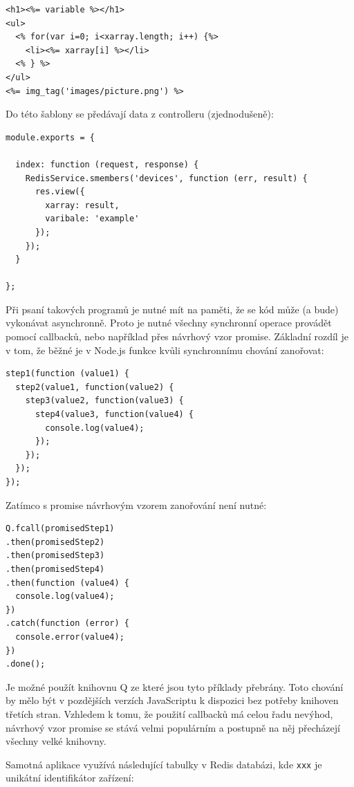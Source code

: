 \begin{verbatim}
<h1><%= variable %></h1>
<ul>
  <% for(var i=0; i<xarray.length; i++) {%>
    <li><%= xarray[i] %></li>
  <% } %>
</ul>
<%= img_tag('images/picture.png') %>
\end{verbatim}

Do této šablony se předávají data z controlleru (zjednodušeně):

\begin{verbatim}
module.exports = {

  index: function (request, response) {
    RedisService.smembers('devices', function (err, result) {
      res.view({
        xarray: result,
        varibale: 'example'
      });
    });
  }

};
\end{verbatim}

Při psaní takových programů je nutné mít na paměti, že se kód může (a bude) vykonávat asynchronně. Proto je nutné všechny synchronní operace provádět pomocí callbacků, nebo například přes návrhový vzor promise. Základní rozdíl je v tom, že běžné je v Node.js funkce kvůli synchronnímu chování zanořovat:

\begin{verbatim}
step1(function (value1) {
  step2(value1, function(value2) {
    step3(value2, function(value3) {
      step4(value3, function(value4) {
        console.log(value4);
      });
    });
  });
});
\end{verbatim}

Zatímco s promise návrhovým vzorem zanořování není nutné:

\begin{verbatim}
Q.fcall(promisedStep1)
.then(promisedStep2)
.then(promisedStep3)
.then(promisedStep4)
.then(function (value4) {
  console.log(value4);
})
.catch(function (error) {
  console.error(value4);
})
.done();
\end{verbatim}

Je možné použít knihovnu Q \cite{q} ze které jsou tyto příklady přebrány. Toto chování by mělo být v pozdějších verzích JavaScriptu k dispozici bez potřeby knihoven třetích stran. Vzhledem k tomu, že použití callbacků má celou řadu nevýhod, návrhový vzor promise se stává velmi populárním a postupně na něj přecházejí všechny velké knihovny.

Samotná aplikace využívá následující tabulky v Redis databázi, kde \texttt{xxx} je unikátní identifikátor zařízení:

